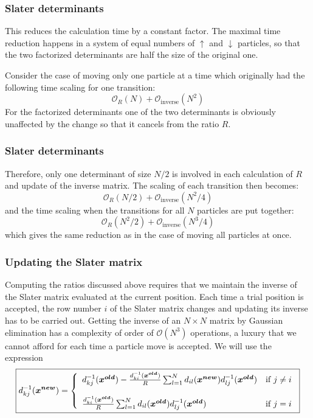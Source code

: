 \documentclass[compress]{beamer}
\newcommand{\be}{\begin{equation}}
\newcommand{\ee}{\end{equation}}
\newcommand{\bigO}{\mathcal{O}}
\newcommand{\bfv}[1]{\boldsymbol{#1}}                     %
\newcommand{\be}{\begin{equation}}                        %
\newcommand{\ee}{\end{equation}}                          %
\begin{document}
\frame
{
  \frametitle{Slater determinants}
\begin{small}
{\scriptsize
This reduces the calculation time by a constant factor. The maximal
time reduction happens in a system of equal numbers of $\uparrow$ and
$\downarrow$ particles, so that the two factorized determinants are
half the size of the original one.


Consider the case of moving only one particle  at a time which
originally had the following time scaling for one transition:
\be
\bigO_R(N)+\bigO_\mathrm{inverse}(N^2)
\ee
For the factorized determinants one of the two determinants is
obviously unaffected by the change so that it cancels from the ratio
$R$. 
}
\end{small}
}

\frame
{
  \frametitle{Slater determinants}
\begin{small}
{\scriptsize
Therefore, only one determinant of size $N/2$ is involved in each
calculation of $R$ and update of the inverse matrix. The scaling of
each transition then becomes:
\be
\bigO_R(N/2)+\bigO_\mathrm{inverse}(N^2/4)
\ee
and the time scaling when the transitions for all $N$ particles are
put together:
\be
\bigO_R(N^2/2)+\bigO_\mathrm{inverse}(N^3/4)
\ee
which gives the same reduction as in the case of moving all particles
at once.
}
\end{small}
}


\frame
{
  \frametitle{Updating the Slater matrix}
\begin{small}
{\scriptsize
Computing the ratios discussed above requires that we maintain 
the inverse of the Slater matrix evaluated at the current position. 
Each time a trial position is accepted, the row number $i$ of the Slater 
matrix changes and updating its inverse has to be carried out. 
Getting the inverse of an $N \times N$ matrix by Gaussian elimination has a 
complexity of order of $\mathcal{O}(N^3)$ operations, a luxury that we 
cannot afford for each time a particle  move is accepted.
We will use the expression
\begin{eqnarray}\label{updatingInverse}
\boxed{d^{-1}_{kj}(\bfv{x^{new}})  = \left\{ 
\begin{array}{l l}
  d^{-1}_{kj}(\bfv{x^{old}}) - \frac{d^{-1}_{ki}(\bfv{x^{old}})}{R} \sum_{l=1}^{N} d_{il}(\bfv{x^{new}})  d^{-1}_{lj}(\bfv{x^{old}}) & \mbox{if $j \neq i$}\nonumber \\ \\
 \frac{d^{-1}_{ki}(\bfv{x^{old}})}{R} \sum_{l=1}^{N} d_{il}(\bfv{x^{old}}) d^{-1}_{lj}(\bfv{x^{old}}) & \mbox{if $j=i$}
\end{array} \right.}\\
\end{eqnarray}
}
\end{small}
}
\end{document}
